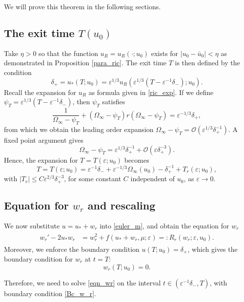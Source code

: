 \documentclass[letterpaper,11pt]{article}
\newcommand{\rmO}{\mathcal{O}}
\newcommand{\eps}{\varepsilon}
\numberwithin{equation}{section}
\theoremstyle{plain}
\begin{document}
We will prove this theorem in the following sections.
\subsection{The exit time \texorpdfstring{$T(u_0)$}{T(u_0)}}\label{exit_time}
Take $\eta>0$ so that the function $u_R = u_R(\cdot; u_0)$ exists for $|u_0-\bar{u}_0|<\eta$ as demonstrated in Proposition \ref{para_ric}. The exit time $T$ is then defined by the condition 
\[
\delta_+ = u_*(T; u_0) = \eps^{1/3}u_R(\eps^{1/3}(T-\eps^{-1}\delta_-); u_0).
\]
Recall the expansion for $u_R$ as formula given in \eqref{ric_exp}. If we define $\psi_T = \eps^{1/3}(T-\eps^{-1}\delta_-)$, then $\psi_T$ satisfies
\[
\frac{1}{\Omega_\infty-\psi_T} + (\Omega_\infty-\psi_T)r(\Omega_\infty-\psi_T) = \eps^{-1/3}\delta_+,
\]
from which we obtain the leading order expansion $\Omega_\infty-\psi_T = \rmO(\eps^{1/3}\delta_+^{-1})$. A fixed point argument gives
\[
\Omega_\infty - \psi_T = \eps^{1/3}\delta_+^{-1} + \rmO(\eps \delta_+^{-3}).
\]
Hence, the expansion for $T=T(\eps; u_0)$ becomes
\begin{equation}\label{T_exp}
T = T(\eps;u_0) = \eps^{-1}\delta_- + \eps^{-1/3}\Omega_\infty(u_0) - \delta_+^{-1} + T_r(\eps;u_0),
\end{equation}
with 
$|T_r|\le C\eps^{2/3}\delta_+^{-3}$, for some constant $C$ independent of $u_0$, as $\eps \to 0$.


\subsection{Equation for \texorpdfstring{$w_r$}{wr} and rescaling}\label{equation_wr}
We now substitute $u = u_* + w_r$ into \eqref{euler_m}, and obtain the equation for $w_r$
\begin{align}\label{eqn_wr}
\begin{split}
w_r' - 2u_*w_r &= w_r^2 + f(u_*+w_r, \mu; \eps) =: R_r(w_r; \eps,u_0).
\end{split}
\end{align}
Moreover, we enforce the boundary condition $u(T; u_0) = \delta_+$, which gives the boundary condition for $w_r$ at $t=T$:
\begin{equation}\label{Bc_w_r}
w_r(T;u_0) = 0.
\end{equation}

Therefore, we need to solve \eqref{eqn_wr} on the interval $t \in (\eps^{-1}\delta_-, T)$, with boundary condition \eqref{Bc_w_r}.
\end{document}
